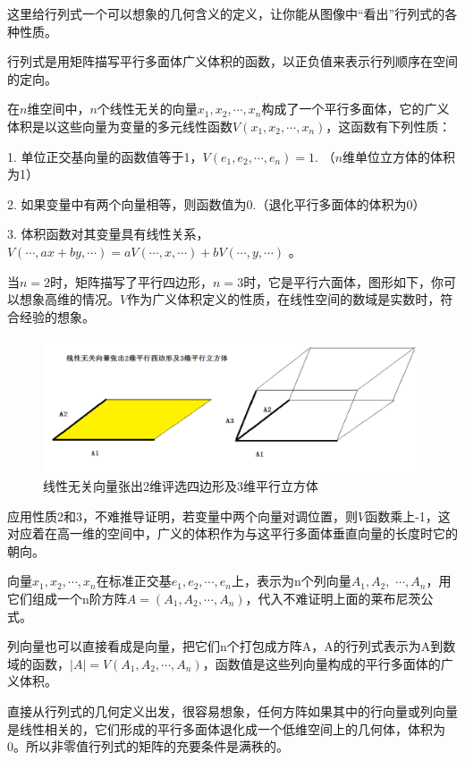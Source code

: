 	这里给行列式一个可以想象的几何含义的定义，让你能从图像中``看出''行列式的各种性质。
	
	行列式是用矩阵描写平行多面体广义体积的函数，以正负值来表示行列顺序在空间的定向。
	
	\kaishu
	
	在$ n $维空间中，$ n $个线性无关的向量$ x_1,x_2,\cdots,x_n $构成了一个平行多面体，它的广义体积是以这些向量为变量的多元线性函数$ V(x_1,x_2,\cdots,x_n) $，这函数有下列性质：
	
	1. 单位正交基向量的函数值等于1，$ V(e_1,e_2,\cdots,e_n)= 1 $. （$ n $维单位立方体的体积为1）
	
	2. 	如果变量中有两个向量相等，则函数值为0.（退化平行多面体的体积为0）
	
	3. 	体积函数对其变量具有线性关系，$ V(\cdots, ax+by, \cdots) = aV(\cdots, x, \cdots) + b V(\cdots, y, \cdots) $ 。
	
	\songti
	
	当$ n=2 $时，矩阵描写了平行四边形，$ n=3 $时，它是平行六面体，图形如下，你可以想象高维的情况。$ V $作为广义体积定义的性质，在线性空间的数域是实数时，符合经验的想象。
	
	\begin{figure}[h]
		\centering
		\includegraphics[width=0.7\linewidth]{pic/160908smn6gw0dy66yp37c.png}
		\caption{线性无关向量张出2维评选四边形及3维平行立方体}
		\label{fig:160908smn6gw0dy66yp37c}
	\end{figure}
	
	应用性质2和3，不难推导证明，若变量中两个向量对调位置，则$ V $函数乘上-1，这对应着在高一维的空间中，广义的体积作为与这平行多面体垂直向量的长度时它的朝向。
	
	向量$ x_1,x_2,\cdots,x_n $在标准正交基$ {e_1,e_2,\cdots,e_n} $上，表示为n个列向量$ A_1, A_2,$  $ \cdots,A_n $，用它们组成一个n阶方阵$ A = (A_1, A_2, \cdots,A_n) $，代入不难证明上面的莱布尼茨公式。
	
	列向量也可以直接看成是向量，把它们n个打包成方阵A，A的行列式表示为A到数域的函数，$ |A| = V(A_1, A_2,\cdots,A_n) $，函数值是这些列向量构成的平行多面体的广义体积。
	
	直接从行列式的几何定义出发，很容易想象，任何方阵如果其中的行向量或列向量是线性相关的，它们形成的平行多面体退化成一个低维空间上的几何体，体积为0。所以非零值行列式的矩阵的充要条件是满秩的。
	
